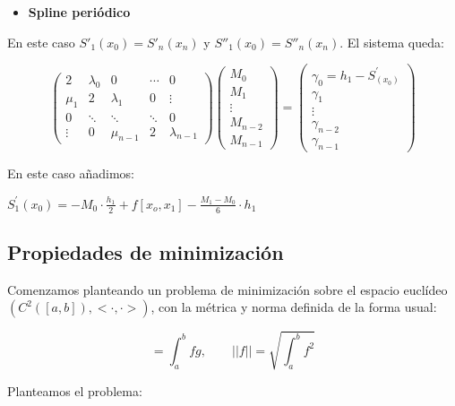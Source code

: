 \documentclass[11pt,spanish,]{article}
\theoremstyle{definition} \newtheorem*{definicion}{Definición}
\begin{document}
\vspace*{2\baselineskip}

\begin{itemize}
\itemsep1pt\parskip0pt
\item
  \textbf{Spline periódico}
\end{itemize}

En este caso $S'_1(x_0) = S'_n(x_n)$ y $S''_1(x_0) = S''_n(x_n)$. El
sistema queda:

\[
\begin{pmatrix}
  2        & \lambda_0 &    0       &   \cdots  &     0          \\
  \mu_1  & 2            & \lambda_1  &   0       &    \vdots      \\
  0      & \ddots    & \ddots     &  \ddots   &     0          \\
  \vdots &     0     & \mu_{n-1}  &    2      & \lambda_{n-1}
\end{pmatrix}
\begin{pmatrix}
  M_0 \\
  M_1 \\
  \vdots \\
  M_{n-2} \\
  M_{n-1}
\end{pmatrix} =
\begin{pmatrix}
  \gamma_0=h_1-S^{'}_(x_0) \\
  \gamma_1 \\
  \vdots \\
  \gamma_{n-2} \\
  \gamma_{n-1}
\end{pmatrix}\]

En este caso añadimos:

${ S^{'}_1(x_0)= -M_0 \cdot \frac{h_1}{2}+ f{[x_o,x_1]} - \frac{M_1-M_0}{6} \cdot h_1 }$

\subsection{Propiedades de
minimización}\label{propiedades-de-minimizaciuxf3n}

Comenzamos planteando un problema de minimización sobre el espacio
euclídeo $(C^2([a,b]), <\cdot,\cdot>)$, con la métrica y norma definida
de la forma usual:

\[<f,g> = \int_a^b fg, \qquad || f || = \sqrt{ \int_a^b f^2}\]

\vspace*{\baselineskip}

Planteamos el problema:
\end{document}
